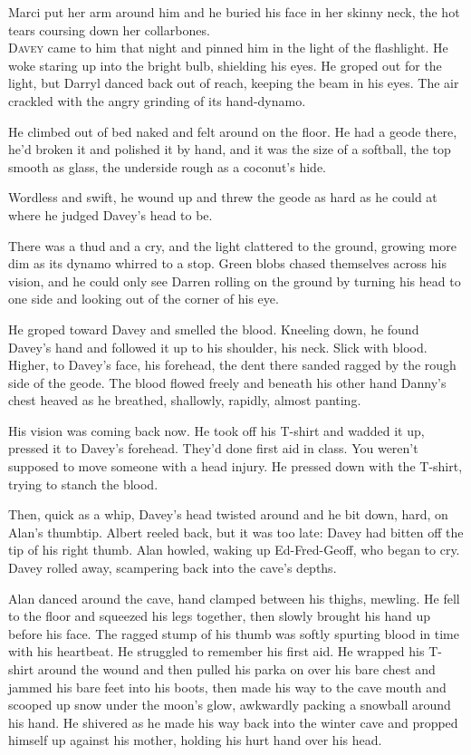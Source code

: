 Marci put her arm around him and he buried his face in her skinny
neck, the hot tears coursing down her collarbones.
\\
\lettrine[lines=3, lhang=.5, nindent=0pt, findent=2pt]{D}{avey} came to him that night and pinned him in the light of the
flashlight.  He woke staring up into the bright bulb, shielding his
eyes.  He groped out for the light, but Darryl danced back out of
reach, keeping the beam in his eyes.  The air crackled with the angry
grinding of its hand-dynamo.

He climbed out of bed naked and felt around on the floor.  He had a
geode there, he'd broken it and polished it by hand, and it was the
size of a softball, the top smooth as glass, the underside rough as a
coconut's hide.

Wordless and swift, he wound up and threw the geode as hard as he
could at where he judged Davey's head to be.

There was a thud and a cry, and the light clattered to the ground,
growing more dim as its dynamo whirred to a stop.  Green blobs chased
themselves across his vision, and he could only see Darren rolling on
the ground by turning his head to one side and looking out of the
corner of his eye.

He groped toward Davey and smelled the blood.  Kneeling down, he found
Davey's hand and followed it up to his shoulder, his neck.  Slick with
blood.  Higher, to Davey's face, his forehead, the dent there sanded
ragged by the rough side of the geode.  The blood flowed freely and
beneath his other hand Danny's chest heaved as he breathed, shallowly,
rapidly, almost panting.

His vision was coming back now.  He took off his T-shirt and wadded it
up, pressed it to Davey's forehead.  They'd done first aid in class. 
You weren't supposed to move someone with a head injury.  He pressed
down with the T-shirt, trying to stanch the blood.

Then, quick as a whip, Davey's head twisted around and he bit down,
hard, on Alan's thumbtip.  Albert reeled back, but it was too late: 
Davey had bitten off the tip of his right thumb.  Alan howled, waking
up Ed-Fred-Geoff, who began to cry.  Davey rolled away, scampering
back into the cave's depths.

Alan danced around the cave, hand clamped between his thighs, mewling. 
He fell to the floor and squeezed his legs together, then slowly
brought his hand up before his face.  The ragged stump of his thumb
was softly spurting blood in time with his heartbeat.  He struggled to
remember his first aid.  He wrapped his T-shirt around the wound and
then pulled his parka on over his bare chest and jammed his bare feet
into his boots, then made his way to the cave mouth and scooped up
snow under the moon's glow, awkwardly packing a snowball around his
hand.  He shivered as he made his way back into the winter cave and
propped himself up against his mother, holding his hurt hand over his
head.

